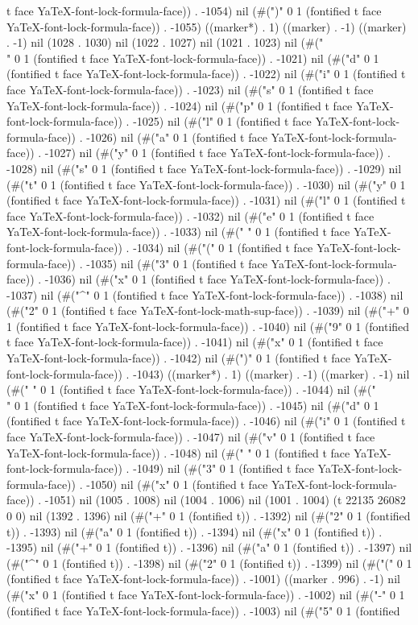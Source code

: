 t face YaTeX-font-lock-formula-face)) . -1054) nil (#(")" 0 1 (fontified t face YaTeX-font-lock-formula-face)) . -1055) ((marker*) . 1) ((marker) . -1) ((marker) . -1) nil (1028 . 1030) nil (1022 . 1027) nil (1021 . 1023) nil (#("\\" 0 1 (fontified t face YaTeX-font-lock-formula-face)) . -1021) nil (#("d" 0 1 (fontified t face YaTeX-font-lock-formula-face)) . -1022) nil (#("i" 0 1 (fontified t face YaTeX-font-lock-formula-face)) . -1023) nil (#("s" 0 1 (fontified t face YaTeX-font-lock-formula-face)) . -1024) nil (#("p" 0 1 (fontified t face YaTeX-font-lock-formula-face)) . -1025) nil (#("l" 0 1 (fontified t face YaTeX-font-lock-formula-face)) . -1026) nil (#("a" 0 1 (fontified t face YaTeX-font-lock-formula-face)) . -1027) nil (#("y" 0 1 (fontified t face YaTeX-font-lock-formula-face)) . -1028) nil (#("s" 0 1 (fontified t face YaTeX-font-lock-formula-face)) . -1029) nil (#("t" 0 1 (fontified t face YaTeX-font-lock-formula-face)) . -1030) nil (#("y" 0 1 (fontified t face YaTeX-font-lock-formula-face)) . -1031) nil (#("l" 0 1 (fontified t face YaTeX-font-lock-formula-face)) . -1032) nil (#("e" 0 1 (fontified t face YaTeX-font-lock-formula-face)) . -1033) nil (#(" " 0 1 (fontified t face YaTeX-font-lock-formula-face)) . -1034) nil (#("(" 0 1 (fontified t face YaTeX-font-lock-formula-face)) . -1035) nil (#("3" 0 1 (fontified t face YaTeX-font-lock-formula-face)) . -1036) nil (#("x" 0 1 (fontified t face YaTeX-font-lock-formula-face)) . -1037) nil (#("^" 0 1 (fontified t face YaTeX-font-lock-formula-face)) . -1038) nil (#("2" 0 1 (fontified t face YaTeX-font-lock-math-sup-face)) . -1039) nil (#("+" 0 1 (fontified t face YaTeX-font-lock-formula-face)) . -1040) nil (#("9" 0 1 (fontified t face YaTeX-font-lock-formula-face)) . -1041) nil (#("x" 0 1 (fontified t face YaTeX-font-lock-formula-face)) . -1042) nil (#(")" 0 1 (fontified t face YaTeX-font-lock-formula-face)) . -1043) ((marker*) . 1) ((marker) . -1) ((marker) . -1) nil (#(" " 0 1 (fontified t face YaTeX-font-lock-formula-face)) . -1044) nil (#("\\" 0 1 (fontified t face YaTeX-font-lock-formula-face)) . -1045) nil (#("d" 0 1 (fontified t face YaTeX-font-lock-formula-face)) . -1046) nil (#("i" 0 1 (fontified t face YaTeX-font-lock-formula-face)) . -1047) nil (#("v" 0 1 (fontified t face YaTeX-font-lock-formula-face)) . -1048) nil (#(" " 0 1 (fontified t face YaTeX-font-lock-formula-face)) . -1049) nil (#("3" 0 1 (fontified t face YaTeX-font-lock-formula-face)) . -1050) nil (#("x" 0 1 (fontified t face YaTeX-font-lock-formula-face)) . -1051) nil (1005 . 1008) nil (1004 . 1006) nil (1001 . 1004) (t 22135 26082 0 0) nil (1392 . 1396) nil (#("+" 0 1 (fontified t)) . -1392) nil (#("2" 0 1 (fontified t)) . -1393) nil (#("a" 0 1 (fontified t)) . -1394) nil (#("x" 0 1 (fontified t)) . -1395) nil (#("+" 0 1 (fontified t)) . -1396) nil (#("a" 0 1 (fontified t)) . -1397) nil (#("^" 0 1 (fontified t)) . -1398) nil (#("2" 0 1 (fontified t)) . -1399) nil (#("(" 0 1 (fontified t face YaTeX-font-lock-formula-face)) . -1001) ((marker . 996) . -1) nil (#("x" 0 1 (fontified t face YaTeX-font-lock-formula-face)) . -1002) nil (#("-" 0 1 (fontified t face YaTeX-font-lock-formula-face)) . -1003) nil (#("5" 0 1 (fontified 